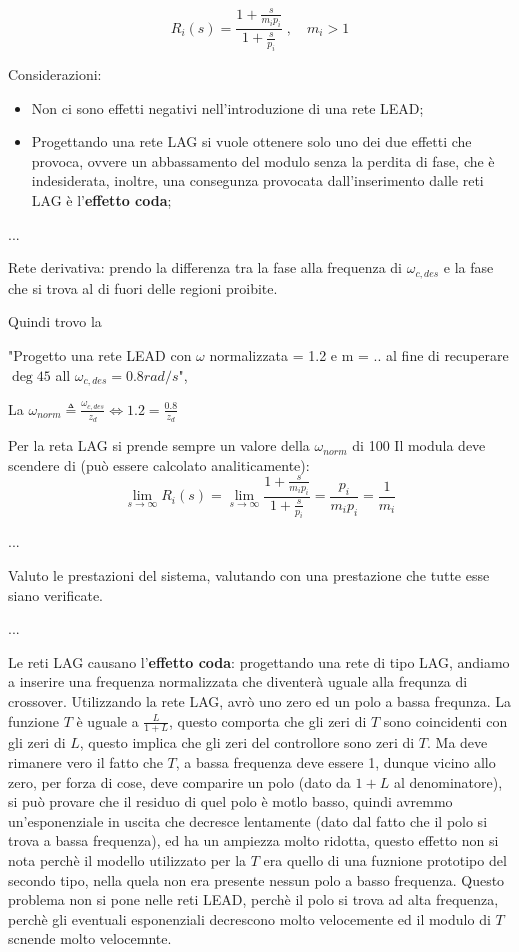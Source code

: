 \documentclass[12pt]{article}
\begin{document}
\[ R_i(s) = \frac{\displaystyle 1 + \frac{s}{m_ip_i} }{\displaystyle 1 + \frac{s}{p_i} }\;,\quad m_i > 1  \]

Considerazioni:
\begin{itemize}
    \item Non ci sono effetti negativi nell'introduzione di una rete LEAD;
    \item Progettando una rete LAG si vuole ottenere solo uno dei due effetti che provoca, ovvere un abbassamento del modulo senza la perdita di fase, che \`e indesiderata, inoltre, una consegunza provocata dall'inserimento dalle reti LAG \`e l'\textbf{effetto coda};
\end{itemize}

...


Rete derivativa: prendo la differenza tra la fase alla frequenza di $\omega_{c,des}$ e la fase che si trova al di fuori delle regioni proibite.

Quindi trovo la 

"Progetto una rete LEAD con $\omega$ normalizzata = 1.2 e m = .. al fine di recuperare $\deg{45}$ all $\omega_{c,des} = 0.8 rad/s$",

La $\omega_{norm} \triangleq \frac{\omega _{c,des}}{z_d} \iff 1.2 = \frac{0.8}{z_d}$


Per la reta LAG si prende sempre un valore della $\omega _{norm}$ di 100
Il modula deve scendere di (pu\`o essere calcolato analiticamente):
\[ \lim_{s \to \infty} R_i(s) = \lim_{s \to \infty} \frac{1 + \frac{s}{m_ip_i} }{1 + \frac{s}{p_i} } = \frac{p_i}{m_ip_i} = \frac{1}{m_i}   \]

...

Valuto le prestazioni del sistema, valutando con una prestazione che tutte esse siano verificate.

...

Le reti LAG causano l'\textbf{effetto coda}: progettando una rete di tipo LAG, andiamo a inserire una frequenza normalizzata che diventer\`a uguale alla frequnza di crossover. Utilizzando la rete LAG, avr\`o uno zero ed un polo a bassa frequnza. La funzione $T$ \`e uguale a $\frac{L}{1 + L}$, questo comporta che gli zeri di $T$ sono coincidenti con gli zeri di $L$, questo implica che gli zeri del controllore sono zeri di $T$. Ma deve rimanere vero il fatto che $T$, a bassa frequenza deve essere 1, dunque vicino allo zero, per forza di cose, deve comparire un polo (dato da $1 + L$ al denominatore), si pu\`o provare che il residuo di quel polo \`e motlo basso, quindi avremmo un'esponenziale in uscita che decresce lentamente (dato dal fatto che il polo si trova a bassa frequenza), ed ha un ampiezza molto ridotta, questo effetto non si nota perch\`e il modello utilizzato per la $T$ era quello di una fuznione prototipo del secondo tipo, nella quela non era presente nessun polo a basso frequenza. Questo problema non si pone nelle reti LEAD, perch\`e il polo si trova ad alta frequenza, perch\`e gli eventuali esponenziali decrescono molto velocemente ed il modulo di $T$ scnende molto velocemnte.
\end{document}

